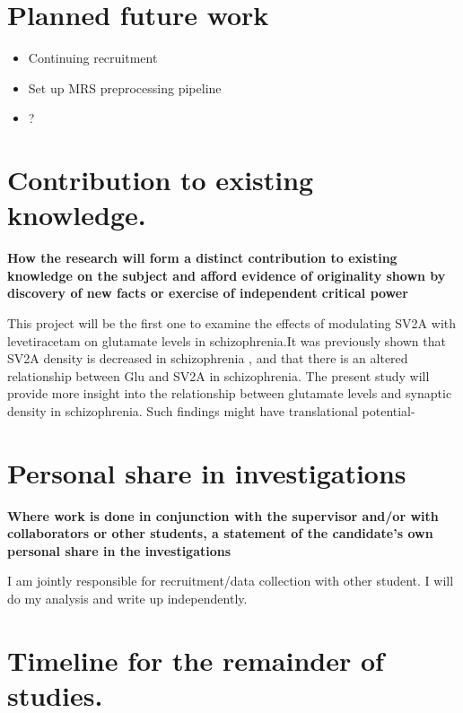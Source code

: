 \documentclass[
  letterpaper,
  DIV=11,
  numbers=noendperiod]{scrartcl}
\providecommand{\tightlist}{%
  \setlength{\itemsep}{0pt}\setlength{\parskip}{0pt}}\usepackage{longtable,booktabs,array}
\begin{document}
\section{Planned future work}\label{planned-future-work}

\begin{itemize}
\tightlist
\item
  Continuing recruitment
\item
  Set up MRS preprocessing pipeline
\item
  ?
\end{itemize}

\section{Contribution to existing
knowledge.}\label{contribution-to-existing-knowledge.}

\textbf{How the research will form a distinct contribution to existing
knowledge on the subject and afford evidence of originality shown by
discovery of new facts or exercise of independent critical power}

This project will be the first one to examine the effects of modulating
SV2A with levetiracetam on glutamate levels in schizophrenia.It was
previously shown that SV2A density is decreased in schizophrenia
\autocite{radhakrishnan_vivo_2021,onwordi_synaptic_2020}, and that there
is an altered relationship between Glu and SV2A in schizophrenia. The
present study will provide more insight into the relationship between
glutamate levels and synaptic density in schizophrenia. Such findings
might have translational potential-

\section{Personal share in
investigations}\label{personal-share-in-investigations}

\textbf{Where work is done in conjunction with the supervisor and/or
with collaborators or other students, a statement of the candidate's own
personal share in the investigations}

I am jointly responsible for recruitment/data collection with other
student. I will do my analysis and write up independently.

\section{Timeline for the remainder of
studies.}\label{timeline-for-the-remainder-of-studies.}
\end{document}
